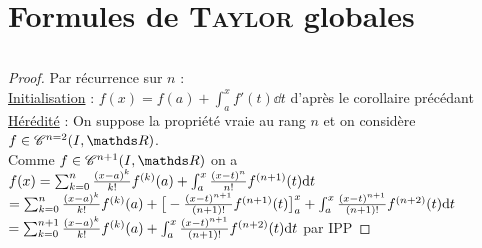 	\section{Formules de \textsc{Taylor} globales}
		${}$ \\ 
		\begin{proof}
		Par récurrence sur $n$ : \\
		\underline{Initialisation} : $f(x) = f(a) + \int_a^x f'(t) \dd t$ d'après le corollaire précédant %
        \\
		\underline{Hérédité} : On suppose la propriété vraie au rang $n$ et on considère $f\in\cont^{n=2}(I,\R)$. \\ Comme $f\in\cont^{n+1}(I,\R)$ 
		on a $f(x) = \sum_{k= 0 }^{n} \frac{(x-a)^k}{k!}f^{(k)}(a) + \int_a^x \frac{(x-t)^n}{n!} f^{(n+1)}(t) {\mathrm{d}} t $ \vspace*{0.2cm} \\ 
		$= \sum_{k= 0 }^{n} \frac{(x-a)^k}{k!}f^{(k)}(a) + \big[ -\frac{(x-t)^{n+1}}{(n+1)!}f^{(n+1)}(t) \big]_a^x + \int_a^x \frac{(x-t)^{n+1}}{(n+1)!}
		f^{(n+2)}(t) {\mathrm{d}} t$ \vspace*{0.2cm} \\ $ = \sum_{k= 0 }^{n+1} \frac{(x-a)^k}{k!}f^{(k)}(a) + \int_a^x \frac{(x-t)^{n+1}}{(n+1)!} f^{(n+2)}(t) 
		{\mathrm{d}} t $ par IPP
		\end{proof}
		${}$\\ 
		\vspace*{0.5cm} \\ 
		\begin{center}
		\fin
		\end{center}